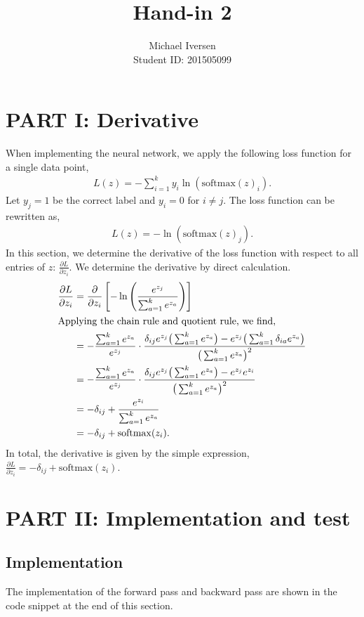 \documentclass{article}
\title{Hand-in 2}
\author{Michael Iversen\\
Student ID: 201505099}
\begin{document}
\maketitle
\section*{PART I: Derivative}
When implementing the neural network, we apply the following loss function for a single data point,
\begin{align*}
	L(z) = - \sum_{i=1}^k y_i \ln(\mathrm{softmax}(z)_i).
\end{align*}
Let $y_j = 1$ be the correct label and $y_i = 0$ for $i \neq j$. The loss function can be rewritten as,
\begin{align*}
	L(z) = - \ln(\mathrm{softmax}(z)_j).
\end{align*}
In this section, we determine the derivative of the loss function with respect to all entries of $z$: $\frac{\partial L}{\partial z_i}$.
We determine the derivative by direct calculation.
\begin{align*}
	\frac{\partial L}{\partial z_i} &= \frac{\partial }{\partial z_i} \left[ - \ln \left( \frac{e^{z_j}}{\sum_{a=1}^k e^{z_a}} \right) \right] \\
	\intertext{Applying the chain rule and quotient rule, we find,}
	&= - \frac{\sum_{a=1}^k e^{z_a}}{e^{z_j}} \cdot \frac{\delta_{ij} e^{z_j} \big(\sum_{a=1}^k e^{z_a}\big) - e^{z_j} \big(\sum_{a=1}^k \delta_{ia}e^{z_a}\big)}{\big(\sum_{a=1}^k e^{z_a}\big)^2} \\
	&= - \frac{\sum_{a=1}^k e^{z_a}}{e^{z_j}} \cdot \frac{\delta_{ij} e^{z_j} \big(\sum_{a=1}^k e^{z_a}\big) - e^{z_j} e^{z_i}}{\big(\sum_{a=1}^k e^{z_a}\big)^2} \\
	&= - \delta_{ij} + \frac{e^{z_i}}{\sum_{a=1}^k e^{z_a}} \\
	&= - \delta_{ij} + \mathrm{softmax}(z_i).
\end{align*}
In total, the derivative is given by the simple expression, $\frac{\partial L}{\partial z_i}  = - \delta_{ij} + \mathrm{softmax}(z_i)$.

\section*{PART II: Implementation and test}
\subsection*{Implementation}
The implementation of the forward pass and backward pass are shown in the code snippet at the end of this section. 
\end{document}
